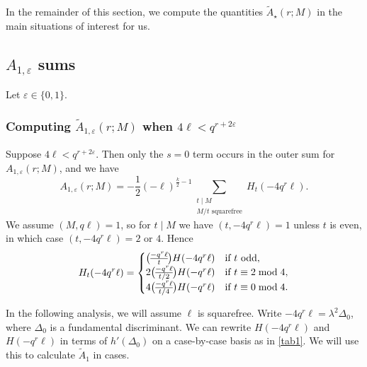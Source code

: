 \documentclass[11pt]{amsart}
\newcommand{\eps}{\varepsilon}
\renewcommand{\mod}{\bmod}
\newcommand{\leg}{\overwithdelims ()}
\numberwithin{lem}{section}
\theoremstyle{remark}
\theoremstyle{definition}
\numberwithin{equation}{section}
\begin{document}
In the remainder of this section, we compute the quantities $\tilde A_\star(r; M)$ in the main situations of interest for us.

\subsection{$A_{1,\eps}$ sums} Let $\eps \in \{ 0, 1 \}$.

\subsubsection{Computing $\tilde A_{1,\eps}(r;M)$ when $4 \ell < q^{r+2\eps}$} \label{sec:A1a}
Suppose $4 \ell < q^{r+2\eps}$.  Then only the $s=0$ term occurs in the outer sum for $A_{1,\eps}(r;M)$, and we have
\[ A_{1,\eps}(r; M) = - \frac 12 (-\ell)^{\frac k2 - 1} \sum_{\substack{t \mid M \\ M/t \text{ squarefree}}} H_t(-4 q^r \ell). \]
We assume $(M, q\ell) = 1$, so for $t \mid M$ we have $(t, -4 q^r \ell) = 1$ unless $t$ is even, in which case 
$(t, -4 q^r \ell) = 2$ or $4$.  Hence
\begin{equation}
\label{eq:Htcases}
 H_t(-4 q^r \ell) = 
\begin{cases}
{ - q^r \ell \leg t} H(-4 q^r \ell) &\text{if } t \text{ odd}, \\
2{ - q^r \ell \leg t/2} H(-q^r \ell) & \text{if }t \equiv 2 \mod 4, \\
4{ - q^r \ell \leg t/4} H(-q^r \ell) & \text{if }t \equiv 0 \mod 4.
\end{cases} 
\end{equation}

In the following analysis, we will assume $\ell$ is squarefree.  Write $-4q^r \ell = \lambda^2 \Delta_0$, where $\Delta_0$ is a fundamental discriminant.  We can rewrite $H(-4q^r \ell)$ and $H(-q^r \ell)$ in terms of $h'(\Delta_0)$ on a case-by-case basis as in \cref{tab1}.
We will use this to calculate $\tilde A_1$ in cases.
\end{document}
